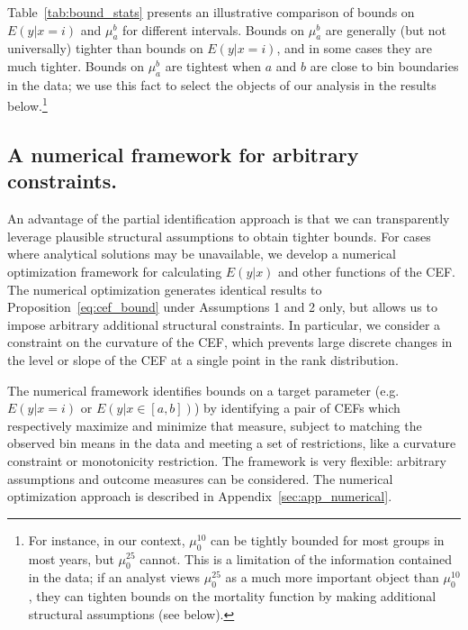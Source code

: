 \documentclass[12pt,letterpaper]{article}
\numberwithin{equation}{section}
\begin{document}
Table~\ref{tab:bound_stats} presents an illustrative comparison of bounds on $E(y|x=i)$ and $\mu_a^b$ for different intervals. Bounds on $\mu_a^b$ are generally (but not universally) tighter than bounds on $E(y|x=i)$, and in some cases they are much tighter. Bounds on $\mu_a^b$ are tightest when $a$ and $b$ are close to bin boundaries in the data; we use this fact to select the objects of our analysis in the results below.\footnote{For instance, in our context, $\mu_0^{10}$ can be tightly bounded for most groups in most years, but $\mu_0^{25}$ cannot. This is a limitation of the information contained in the data; if an analyst views $\mu_0^{25}$ as a much more important object than $\mu_0^{10}$, they can tighten bounds on the mortality function by making additional structural assumptions (see below).}

\subsection{A numerical framework for arbitrary constraints.}
An advantage of the partial identification approach is that we can transparently leverage plausible structural assumptions to obtain tighter bounds. For cases where analytical solutions may be unavailable, we develop a numerical optimization framework for calculating $E(y|x)$ and other functions of the CEF. The numerical optimization generates identical results to Proposition~\ref{eq:cef_bound} under Assumptions 1 and 2 only, but allows us to impose arbitrary additional structural constraints. In particular, we consider a constraint on the curvature of the CEF, which prevents large discrete changes in the level or slope of the CEF at a single point in the rank distribution.

The numerical framework identifies bounds on a target parameter (e.g. $E(y|x=i)$ or $E(y|x \in [a,b])$) by identifying a pair of CEFs which respectively maximize and minimize that measure, subject to matching the observed bin means in the data and meeting a set of restrictions, like a curvature constraint or monotonicity restriction. The framework is very flexible: arbitrary assumptions and outcome measures can be considered. The numerical optimization approach is described in Appendix~\ref{sec:app_numerical}.
\end{document}
